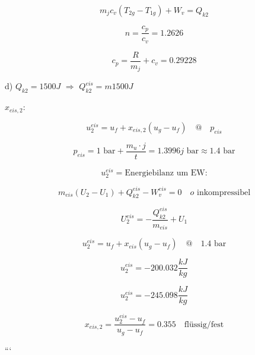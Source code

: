 \[
m_j c_v (T_{2g} - T_{1g}) + W_v = Q_{k2}
\]

\[
n = \frac{c_p}{c_v} = 1.2626
\]

\[
c_p = \frac{R}{m_j} + c_v = 0.29228
\]

d) \( Q_{k2} = 1500 J \) \(\Rightarrow\) \( Q_{k2}^{eis} = m 1500 J \)

\( x_{eis,2} \):

\[
u_2^{eis} = u_f + x_{eis,2} (u_g - u_f) \quad @ \quad p_{eis}
\]

\[
p_{eis} = 1 \text{ bar} + \frac{m_u \cdot j}{t} = 1.3996 j \text{ bar} \approx 1.4 \text{ bar}
\]

\[
u_2^{eis} = \text{Energiebilanz um EW:}
\]

\[
m_{eis} (U_2 - U_1) + Q_{k2}^{eis} - W_v^{eis} = 0 \quad o \text{ inkompressibel}
\]

\[
U_2^{eis} = - \frac{Q_{k2}^{eis}}{m_{eis}} + U_1
\]

\[
u_2^{eis} = u_f + x_{eis} (u_g - u_f) \quad @ \quad 1.4 \text{ bar}
\]

\[
u_2^{eis} = -200.032 \frac{kJ}{kg}
\]

\[
u_2^{eis} = -245.098 \frac{kJ}{kg}
\]

\[
x_{eis,2} = \frac{u_2^{eis} - u_f}{u_g - u_f} = 0.355 \quad \text{flüssig/fest}
\]

```